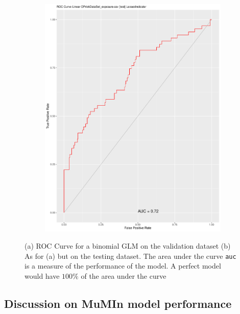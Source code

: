 \documentclass{DissertateUSU}
\begin{document}
\begin{figure}
\begin{subfigure}[b]{0.5\textwidth}
   \includegraphics[width=1\linewidth]{ROC _Curve_BINTesting.pdf}
   \caption{}
   \label{ROC_Testing_dataset}
\end{subfigure}

\caption[ROC Curves for GLM over validation and testing set]{(a) ROC Curve for a binomial GLM on the validation dataset (b) As for (a) but on the testing dataset. The area under the curve \texttt{auc} is a measure of the performance of the model. A perfect model would have $100\%$ of the area under the curve}
\end{figure}

\singlespacing

\doublespacing

\subsection{Discussion on MuMIn model performance}
\label{ssec:Discussion on MuMIn model performance}
\end{document}
